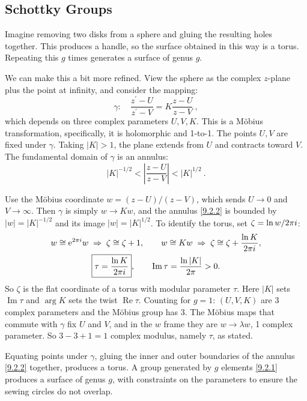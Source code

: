 \subsection*{Schottky Groups}

Imagine removing two disks from a sphere and gluing the resulting holes together. This produces a handle, so the surface obtained in this way is a torus.
Repeating this $g$ times generates a surface of genus $g$.

We can make this a bit more refined. View the sphere as the complex $z$-plane plus the point at infinity, and consider the mapping:
\begin{equation}
	\gamma: \quad \frac{z^{\prime}-U}{z^{\prime}-V}=K \frac{z-U}{z-V} \:, \label{9.2.1}
\end{equation}
which depends on three complex parameters $U, V, K$. This is a Möbius transformation, specifically, it is holomorphic and 1-to-1.
The points $U, V$ are fixed under $\gamma$. 
Taking $|K|>1$, the plane extends from $U$ and contracts toward $V$. The fundamental domain of $\gamma$ is an annulus:
\begin{equation}
	|K|^{-1/2} < \left|\frac{z-U}{z-V}\right| < |K|^{1/2} \:.
	\label{9.2.2}
\end{equation}
\begin{tcolorbox}[breakable]
	\begin{remark}
		Use the M\"obius coordinate $w=(z-U)/(z-V)$, which sends $U\to0$ and $V\to\infty$. Then $\gamma$ is simply $w\to Kw$, and the annulus \eqref{9.2.2} is bounded by $|w|=|K|^{-1/2}$ and its image $|w|=|K|^{1/2}$. To identify the torus, set $\zeta=\ln w/2\pi i$:
		\begin{gather*}
			w\cong\mathrm{e}^{2\pi i}w\;\Rightarrow\;\zeta\cong\zeta+1,\qquad
			w\cong Kw\;\Rightarrow\;\zeta\cong\zeta+\frac{\ln K}{2\pi i},\\
			\boxed{\tau=\frac{\ln K}{2\pi i}},\qquad \operatorname{Im}\tau=\frac{\ln|K|}{2\pi}>0 .
		\end{gather*}
		So $\zeta$ is the flat coordinate of a torus with modular parameter $\tau$. Here $|K|$ sets $\operatorname{Im}\tau$ and $\arg K$ sets the twist $\operatorname{Re}\tau$. Counting for $g=1$: $(U,V,K)$ are 3 complex parameters and the M\"obius group has 3. The M\"obius maps that commute with $\gamma$ fix $U$ and $V$, and in the $w$ frame they are $w\to\lambda w$, 1 complex parameter. So $3-3+1=1$ complex modulus, namely $\tau$, as stated.
	\end{remark}
\end{tcolorbox}
Equating points under $\gamma$, gluing the inner and outer boundaries of the annulus \eqref{9.2.2} together, produces a torus. A group generated by $g$ elements \eqref{9.2.1} produces a surface of genus $g$, 
with constraints on the parameters to ensure the sewing circles do not overlap.

